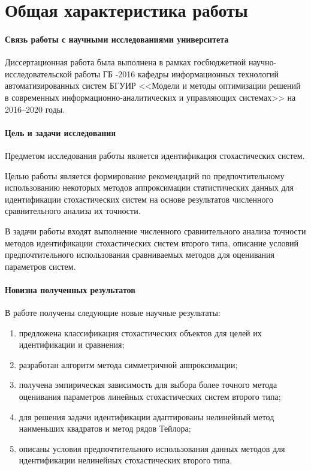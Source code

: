 \section{Общая характеристика работы}

\paragraph{Связь работы с научными исследованиями университета}
Диссертационная работа была выполнена в рамках госбюджетной
научно-исследовательской работы ГБ -2016 кафедры
информационных технологий автоматизированных систем БГУИР
<<Модели и методы оптимизации решений в современных
информационно-аналитических и управляющих системах>>
на 2016--2020 годы.

\paragraph{Цель и задачи исследования}
Предметом исследования работы является идентификация стохастических систем.

Целью работы является формирование рекомендаций по предпочтительному использованию
некоторых методов аппроксимации статистических данных для идентификации
стохастических систем на основе результатов численного сравнительного
анализа их точности.

В задачи работы входят выполнение численного сравнительного анализа
точности методов идентификации стохастических систем второго типа,
описание условий предпочтительного использования сравниваемых методов
для оценивания параметров систем.

\pagebreak
\paragraph{Новизна полученных результатов}

В работе получены следующие новые научные результаты:
\begin{enumerate}
\item предложена классификация стохастических объектов для целей их
  идентификации и сравнения;
\item разработан алгоритм метода симметричной аппроксимации;
\item получена эмпирическая зависимость для выбора более точного метода
  оценивания параметров линейных стохастических систем второго типа;
\item для решения задачи идентификации адаптированы нелинейный метод
  наименьших квадратов и метод рядов Тейлора;
\item описаны условия предпочтительного использования данных
  методов для идентификации нелинейных стохастических второго типа.
\end{enumerate}

